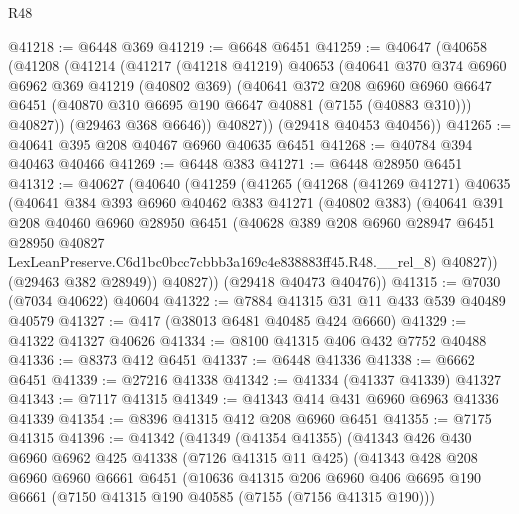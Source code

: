 \begin{lexlean}{R48}
\begin{coremodule}
@41218 := @6448 @369
@41219 := @6648 @6451
@41259 := @40647
    (@40658
      (@41208
        (@41214
          (@41217
            (@41218 @41219)
            @40653
            (@40641
              @370
              @374
              @6960
              @6962
              @369
              @41219
              (@40802 @369)
              (@40641
                @372
                @208
                @6960
                @6960
                @6647
                @6451
                (@40870 @310 @6695 @190 @6647 @40881 (@7155 (@40883 @310)))
                @40827))
            (@29463 @368 @6646))
          @40827))
      (@29418 @40453 @40456))
@41265 := @40641 @395 @208 @40467 @6960 @40635 @6451
@41268 := @40784 @394 @40463 @40466
@41269 := @6448 @383
@41271 := @6448 @28950 @6451
@41312 := @40627
    (@40640
      (@41259
        (@41265
          (@41268
            (@41269 @41271)
            @40635
            (@40641
              @384
              @393
              @6960
              @40462
              @383
              @41271
              (@40802 @383)
              (@40641
                @391
                @208
                @40460
                @6960
                @28950
                @6451
                (@40628
                  @389
                  @208
                  @6960
                  @28947
                  @6451
                  @28950
                  @40827
                  LexLeanPreserve.C6d1bc0bcc7cbbb3a169c4e838883ff45.R48.__rel_8)
                @40827))
            (@29463 @382 @28949))
          @40827))
      (@29418 @40473 @40476))
@41315 := @7030 (@7034 @40622) @40604
@41322 := @7884 @41315 @31 @11 @433 @539 @40489 @40579
@41327 := @417 (@38013 @6481 @40485 @424 @6660)
@41329 := @41322 @41327 @40626
@41334 := @8100 @41315 @406 @432 @7752 @40488
@41336 := @8373 @412 @6451
@41337 := @6448 @41336
@41338 := @6662 @6451
@41339 := @27216 @41338
@41342 := @41334 (@41337 @41339) @41327
@41343 := @7117 @41315
@41349 := @41343 @414 @431 @6960 @6963 @41336 @41339
@41354 := @8396 @41315 @412 @208 @6960 @6451
@41355 := @7175 @41315
@41396 := @41342
    (@41349
      (@41354 @41355)
      (@41343
        @426
        @430
        @6960
        @6962
        @425
        @41338
        (@7126 @41315 @11 @425)
        (@41343
          @428
          @208
          @6960
          @6960
          @6661
          @6451
          (@10636
            @41315
            @206
            @6960
            @406
            @6695
            @190
            @6661
            (@7150 @41315 @190 @40585 (@7155 (@7156 @41315 @190)))

\end{coremodule}
\end{lexlean}
